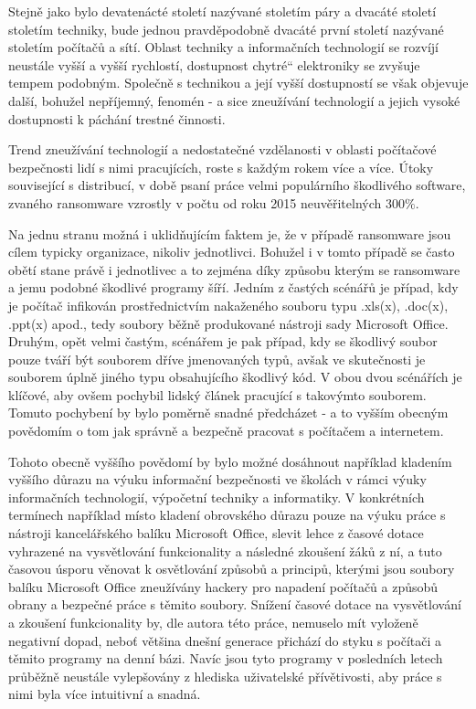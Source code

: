 \documentclass[a4paper, 11pt]{article}
\providecommand{\uv}[1]{\quotedblbase #1\textquotedblleft}
\begin{document}
Stejně jako bylo devatenácté století nazývané stoletím páry a dvacáté století stoletím techniky, bude jednou pravděpodobně dvacáté první století nazývané stoletím počítačů a sítí. Oblast techniky a informačních technologií se rozvíjí neustále vyšší a vyšší rychlostí, dostupnost \uv{chytré} elektroniky se zvyšuje tempem podobným. Společně s technikou a její vyšší dostupností se však objevuje další, bohužel nepříjemný, fenomén \-- a sice zneužívání technologií a jejich vysoké dostupnosti k páchání trestné činnosti. 

Trend zneužívání technologií a nedostatečné vzdělanosti v oblasti počítačové bezpečnosti lidí s nimi pracujících, roste s každým rokem více a více. Útoky související s distribucí, v době psaní práce velmi populárního škodlivého software, zvaného ransomware vzrostly v počtu od roku 2015 neuvěřitelných 300$\%$.

Na jednu stranu možná i uklidňujícím faktem je, že v případě ransomware jsou cílem typicky organizace, nikoliv jednotlivci. Bohužel i v tomto případě se často obětí stane právě i jednotlivec a to zejména díky způsobu kterým se ransomware a jemu podobné škodlivé programy šíří. Jedním z častých scénářů je případ, kdy je počítač infikován prostřednictvím nakaženého souboru typu .xls(x), .doc(x), .ppt(x) apod., tedy soubory běžně produkované nástroji sady Microsoft Office. Druhým, opět velmi častým, scénářem je pak případ, kdy se škodlivý soubor pouze tváří být souborem dříve jmenovaných typů, avšak ve skutečnosti je souborem úplně jiného typu obsahujícího škodlivý kód. V obou dvou scénářích je klíčové, aby ovšem pochybil lidský článek pracující s takovýmto souborem. Tomuto pochybení by bylo poměrně snadné předcházet - a to vyšším obecným povědomím o tom jak správně a bezpečně pracovat s počítačem a internetem. 

Tohoto obecně vyššího povědomí by bylo možné dosáhnout například kladením vyššího důrazu na výuku informační bezpečnosti ve školách v rámci výuky informačních technologií, výpočetní techniky a informatiky. V konkrétních termínech například místo kladení obrovského důrazu pouze na výuku práce s nástroji kancelářského balíku Microsoft Office, slevit lehce z časové dotace vyhrazené na vysvětlování funkcionality a následné zkoušení žáků z ní, a tuto časovou úsporu věnovat k osvětlování způsobů a principů, kterými jsou soubory balíku Microsoft Office zneužívány hackery pro napadení počítačů a způsobů obrany a bezpečné práce s těmito soubory. Snížení časové dotace na vysvětlování a zkoušení funkcionality by, dle autora této práce, nemuselo mít vyloženě negativní dopad, neboť většina dnešní generace přichází do styku s počítači a těmito programy na denní bázi. Navíc jsou tyto programy v posledních letech průběžně neustále vylepšovány z hlediska uživatelské přívětivosti, aby práce s nimi byla více intuitivní a snadná. 
\end{document}
